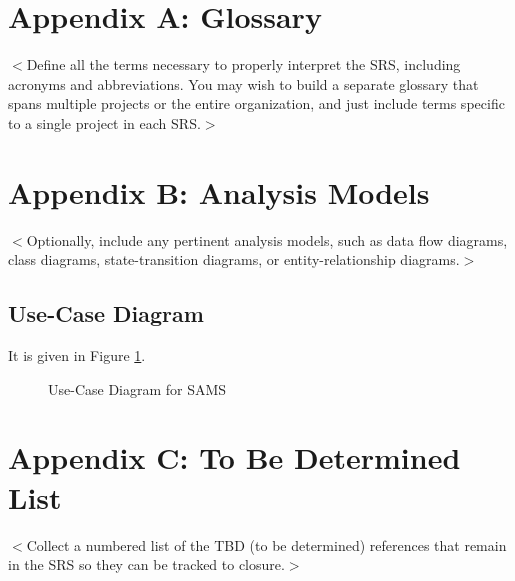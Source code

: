 \documentclass{scrreprt}
\begin{document}
\section{Appendix A: Glossary}
$<$Define all the terms necessary to properly interpret the SRS, including 
acronyms and abbreviations. You may wish to build a separate glossary that spans 
multiple projects or the entire organization, and just include terms specific to 
a single project in each SRS.$>$

\section{Appendix B: Analysis Models}
$<$Optionally, include any pertinent analysis models, such as data flow 
diagrams, class diagrams, state-transition diagrams, or entity-relationship 
diagrams.$>$
\subsection{Use-Case Diagram}
It is given in Figure \ref{fig:use-case}.
\begin{figure}
	\centering
	\caption{Use-Case Diagram for SAMS}
	\label{fig:use-case}
\end{figure}

\section{Appendix C: To Be Determined List}
$<$Collect a numbered list of the TBD (to be determined) references that remain 
in the SRS so they can be tracked to closure.$>$
\end{document}
